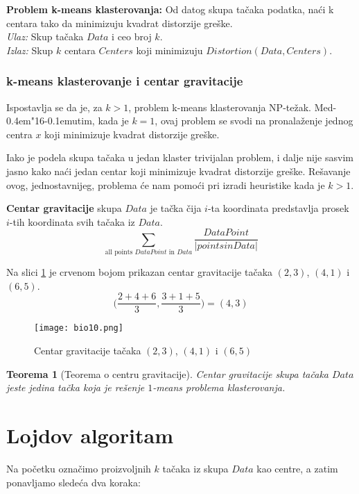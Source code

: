 \documentclass[a4paper]{book}
\newtheorem{teorema}[definicija]{Teorema}
\def \dj {d\kern-0.4em\char"16\kern-0.1em}
\begin{document}
\begin{tcolorbox}
\textbf{Problem k-means klasterovanja:} Od datog skupa tačaka podatka, naći k centara tako da minimizuju kvadrat distorzije greške.\\
\textit{Ulaz:} Skup tačaka $Data$ i ceo broj $k$.\\
\textit{Izlaz:} Skup $k$ centara $Centers$ koji minimizuju $Distortion(Data, Centers)$.
\end{tcolorbox}

\subsubsection{k-means klasterovanje i centar gravitacije}

Ispostavlja se da je, za $k>1$, problem k-means klasterovanja NP-težak. Me\dj utim, kada je $k=1$, ovaj problem se svodi na pronalaženje jednog centra $x$ koji minimizuje kvadrat distorzije greške. 

Iako je podela skupa tačaka u jedan klaster trivijalan problem, i dalje nije sasvim jasno kako naći jedan centar koji minimizuje kvadrat distorzije greške. Rešavanje ovog, jednostavnijeg, problema će nam pomoći pri izradi heuristike kada je $k>1$.

\textbf{Centar gravitacije} skupa $Data$ je tačka čija $i$-ta koordinata predstavlja prosek $i$-tih koordinata svih tačaka iz $Data$.
$$\sum_{\text{all points }DataPoint\text{ in }Data}\frac{DataPoint}{|points in Data|}$$

Na slici \ref{slika 9} je crvenom bojom prikazan centar gravitacije tačaka $(2,3)$, $(4,1)$ i $(6,5)$.
$$ \bigg(\frac{2+4+6}{3}, \frac{3+1+5}{3}\bigg) = (4,3)$$
\begin{figure}[h]
    \centering
    \texttt{[image: bio10.png]}
    \caption{Centar gravitacije tačaka $(2,3)$, $(4,1)$ i $(6,5)$}
    \label{slika 9}
\end{figure}

\begin{teorema}[Teorema o centru gravitacije]{Centar gravitacije skupa tačaka $Data$ jeste jedina tačka koja je rešenje $1$-means problema klasterovanja.}
\end{teorema}

\section{Lojdov algoritam}

Na početku označimo proizvoljnih $k$ tačaka iz skupa $Data$ kao centre, a zatim ponavljamo sledeća dva koraka:
\end{document}
